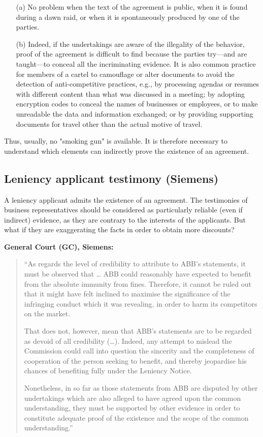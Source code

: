     \begin{enumerate}
        \item[(a)] No problem when the text of the agreement is public, when it is found during a dawn raid, or when it is spontaneously produced by one of the parties.
        \item[(b)] Indeed, if the undertakings are aware of the illegality of the behavior, proof of the agreement is difficult to find because the parties try—and are taught—to conceal all the incriminating evidence. It is also common practice for members of a cartel to camouflage or alter documents to avoid the detection of anti-competitive practices, e.g., by processing agendas or resumes with different content than what was discussed in a meeting; by adopting encryption codes to conceal the names of businesses or employees, or to make unreadable the data and information exchanged; or by providing supporting documents for travel other than the actual motive of travel.
    \end{enumerate}
    
    \noindent Thus, usually, no "smoking gun" is available. It is therefore necessary to understand which elements can indirectly prove the existence of an agreement.

    \subsection{Leniency applicant testimony (Siemens)}

        \noindent A leniency applicant admits the existence of an agreement. The testimonies of business representatives should be considered as particularly reliable (even if indirect) evidence, as they are contrary to the interests of the applicants. But what if they are exaggerating the facts in order to obtain more discounts?

        \noindent \textbf{General Court (GC), Siemens:}
        
        \begin{quote}
        ``As regards the level of credibility to attribute to ABB’s statements, it must be observed that … ABB could reasonably have expected to benefit from the absolute immunity from fines. Therefore, it cannot be ruled out that it might have felt inclined to maximise the significance of the infringing conduct which it was revealing, in order to harm its competitors on the market.
        
        That does not, however, mean that ABB’s statements are to be regarded as devoid of all credibility (…). Indeed, any attempt to mislead the Commission could call into question the sincerity and the completeness of cooperation of the person seeking to benefit, and thereby jeopardise his chances of benefiting fully under the Leniency Notice.
        
        Nonetheless, in so far as those statements from ABB are disputed by other undertakings which are also alleged to have agreed upon the common understanding, they must be supported by other evidence in order to constitute adequate proof of the existence and the scope of the common understanding.''
        \end{quote}

